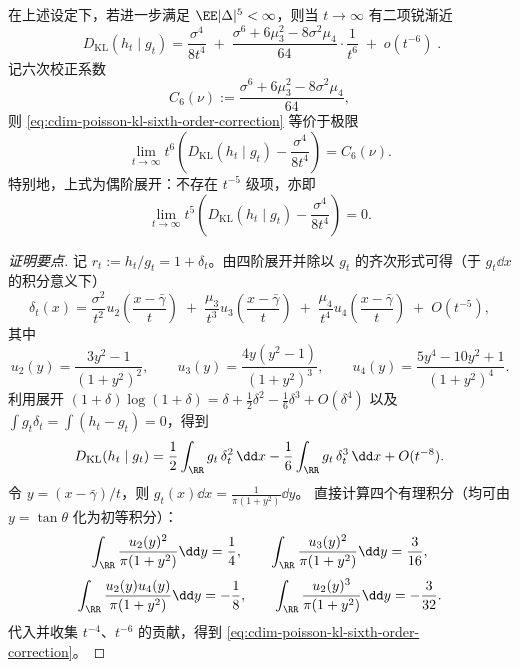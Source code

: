 \begin{proposition}\label{prop:cdim-poisson-kl-sixth-order-correction}
在上述设定下，若进一步满足 \(\EE|\Delta|^5<\infty\)，则当 \(t\to\infty\) 有二项锐渐近
\begin{equation}\label{eq:cdim-poisson-kl-sixth-order-correction}
\boxed{\;
D_{\mathrm{KL}}(h_t\mid g_t)
=\frac{\sigma^4}{8t^4}
\;+\;
\frac{\sigma^6+6\mu_3^2-8\sigma^2\mu_4}{64}\cdot\frac{1}{t^6}
\;+\;o(t^{-6})\; }.
\end{equation}
记六次校正系数
\[
C_6(\nu):=\frac{\sigma^6+6\mu_3^2-8\sigma^2\mu_4}{64},
\]
则 \eqref{eq:cdim-poisson-kl-sixth-order-correction} 等价于极限
\[
\lim_{t\to\infty}t^{6}\left(D_{\mathrm{KL}}(h_t\mid g_t)-\frac{\sigma^4}{8t^4}\right)=C_6(\nu).
\]
特别地，上式为偶阶展开：不存在 \(t^{-5}\) 级项，亦即
\[
\lim_{t\to\infty}t^{5}\left(D_{\mathrm{KL}}(h_t\mid g_t)-\frac{\sigma^4}{8t^4}\right)=0.
\]
\end{proposition}
\begin{proof}[证明要点]
记 \(r_t:=h_t/g_t=1+\delta_t\)。由四阶展开并除以 \(g_t\) 的齐次形式可得（于 \(g_t\dd x\) 的积分意义下）
\[
\delta_t(x)
=\frac{\sigma^2}{t^2}u_2\!\left(\frac{x-\bar\gamma}{t}\right)
\;+\;\frac{\mu_3}{t^3}u_3\!\left(\frac{x-\bar\gamma}{t}\right)
\;+\;\frac{\mu_4}{t^4}u_4\!\left(\frac{x-\bar\gamma}{t}\right)
\;+\;O(t^{-5}),
\]
其中
\[
u_2(y)=\frac{3y^2-1}{(1+y^2)^2},\qquad
u_3(y)=\frac{4y(y^2-1)}{(1+y^2)^3},\qquad
u_4(y)=\frac{5y^4-10y^2+1}{(1+y^2)^4}.
\]
利用展开
\(
(1+\delta)\log(1+\delta)=\delta+\frac12\delta^2-\frac16\delta^3+O(\delta^4)
\)
以及 \(\int g_t\delta_t=\int(h_t-g_t)=0\)，得到
\[
D_{\mathrm{KL}}(h_t\mid g_t)
=\frac12\int_{\RR} g_t\,\delta_t^2\,\dd x-\frac16\int_{\RR} g_t\,\delta_t^3\,\dd x+O(t^{-8}).
\]
令 \(y=(x-\bar\gamma)/t\)，则 \(g_t(x)\dd x=\frac{1}{\pi(1+y^2)}\dd y\)。
直接计算四个有理积分（均可由 \(y=\tan\theta\) 化为初等积分）：
\[
\int_{\RR}\frac{u_2(y)^2}{\pi(1+y^2)}\dd y=\frac14,\qquad
\int_{\RR}\frac{u_3(y)^2}{\pi(1+y^2)}\dd y=\frac{3}{16},
\]
\[
\int_{\RR}\frac{u_2(y)u_4(y)}{\pi(1+y^2)}\dd y=-\frac18,\qquad
\int_{\RR}\frac{u_2(y)^3}{\pi(1+y^2)}\dd y=-\frac{3}{32}.
\]
代入并收集 \(t^{-4}\)、\(t^{-6}\) 的贡献，得到 \eqref{eq:cdim-poisson-kl-sixth-order-correction}。
\end{proof}

